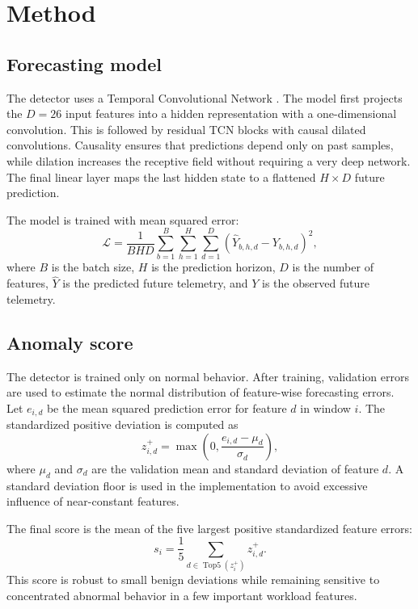 \documentclass[a4paper,12pt]{extarticle}
\begin{document}
\section{Method}
\label{sec:method}

\subsection{Forecasting model}

The detector uses a Temporal Convolutional Network \cite{bai2018tcn}. The model first projects the $D=26$ input features into a hidden representation with a one-dimensional convolution. This is followed by residual TCN blocks with causal dilated convolutions. Causality ensures that predictions depend only on past samples, while dilation increases the receptive field without requiring a very deep network. The final linear layer maps the last hidden state to a flattened $H \times D$ future prediction.

The model is trained with mean squared error:
\begin{equation}
    \mathcal{L} =
    \frac{1}{BHD}
    \sum_{b=1}^{B}
    \sum_{h=1}^{H}
    \sum_{d=1}^{D}
    \left(\hat{Y}_{b,h,d} - Y_{b,h,d}\right)^2,
    \label{eq:mse}
\end{equation}
where $B$ is the batch size, $H$ is the prediction horizon, $D$ is the number of features, $\hat{Y}$ is the predicted future telemetry, and $Y$ is the observed future telemetry.

\subsection{Anomaly score}

The detector is trained only on normal behavior. After training, validation errors are used to estimate the normal distribution of feature-wise forecasting errors. Let $e_{i,d}$ be the mean squared prediction error for feature $d$ in window $i$. The standardized positive deviation is computed as
\begin{equation}
    z_{i,d}^{+} =
    \max\left(0, \frac{e_{i,d} - \mu_d}{\sigma_d}\right),
    \label{eq:zscore}
\end{equation}
where $\mu_d$ and $\sigma_d$ are the validation mean and standard deviation of feature $d$. A standard deviation floor is used in the implementation to avoid excessive influence of near-constant features.

The final score is the mean of the five largest positive standardized feature errors:
\begin{equation}
    s_i = \frac{1}{5}\sum_{d \in \operatorname{Top5}(z_i^+)} z_{i,d}^{+}.
    \label{eq:score}
\end{equation}
This score is robust to small benign deviations while remaining sensitive to concentrated abnormal behavior in a few important workload features.
\end{document}
